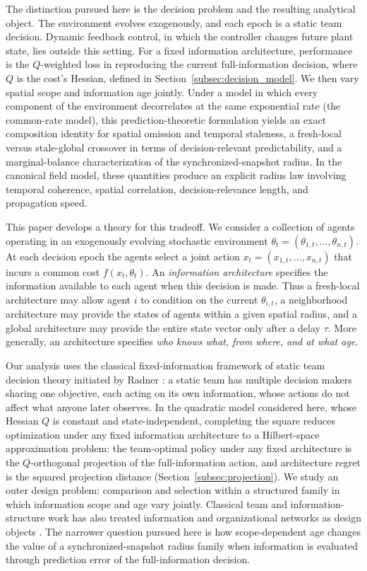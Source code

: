 \documentclass[11pt]{article}
\begin{document}
The distinction pursued here is the decision problem and the resulting
analytical object. The environment evolves exogenously, and each epoch is a
static team decision. Dynamic feedback control, in which the controller changes
future plant state, lies outside this setting. For a fixed information
architecture, performance is the $Q$-weighted loss in reproducing the current
full-information decision, where $Q$ is the cost's Hessian, defined in
Section~\ref{subsec:decision_model}. We then vary spatial scope and information
age jointly. Under a model in which every component of the environment
decorrelates at the same exponential rate (the common-rate model), this
prediction-theoretic formulation
yields an exact composition identity for spatial omission and temporal
staleness, a fresh-local versus stale-global crossover in terms of decision-relevant
predictability, and a marginal-balance characterization of the
synchronized-snapshot radius. In the canonical field model, these quantities
produce an explicit radius law involving temporal coherence, spatial
correlation, decision-relevance length, and propagation speed.

This paper develops a theory for this tradeoff. We consider a collection of
agents operating in an exogenously evolving stochastic environment
$\theta_t=(\theta_{1,t},\ldots,\theta_{n,t})$. At each decision epoch the agents
select a joint action $x_t=(x_{1,t},\ldots,x_{n,t})$ that incurs a common cost
$f(x_t,\theta_t)$. An \emph{information architecture} specifies the information
available to each agent when this decision is made. Thus a fresh-local
architecture may allow agent $i$ to condition on the current $\theta_{i,t}$,
a neighborhood architecture may provide the states of agents within a given
spatial radius, and a global architecture may provide the entire state vector
only after a delay $\tau$. More generally, an architecture specifies
\emph{who knows what, from where, and at what age}.

Our analysis uses the classical fixed-information framework of static team
decision theory initiated by Radner \cite{radner1962team}: a static team has
multiple decision makers sharing one objective, each acting on its own
information, whose actions do not affect what anyone later observes. In the
quadratic model considered here, whose Hessian $Q$ is constant and
state-independent, completing the square
reduces optimization under any fixed information architecture to a
Hilbert-space approximation problem: the team-optimal policy under any fixed
architecture is the $Q$-orthogonal projection of the full-information action,
and architecture regret is the squared projection distance
(Section~\ref{subsec:projection}). We study
an outer design problem: comparison and selection within a
structured family in which information scope and age vary jointly. Classical
team and information-structure work
has also treated information and organizational networks as design objects
\cite{marschak1972economic,summers2017information}. The narrower question
pursued here is how scope-dependent age changes the value of a
synchronized-snapshot radius family when information is evaluated through
prediction error of the full-information decision.
\end{document}
